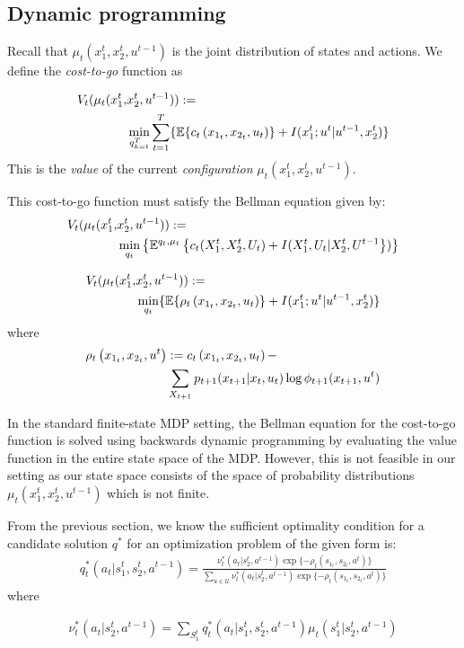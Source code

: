 \subsection{Dynamic programming}
Recall that $\mu_t(x_1^t, x_2^t,u^{t-1})$ is the joint distribution of states and actions. We define the \emph{cost-to-go} function as

\begin{align}
V_t(\mu_t(x_1^t,& x_2^t,u^{t-1}))  := \nonumber \\
& \min_{q_{k=t}^T} \sum_{t=1}^{T}\{ \mathbb{E}\{c_t\left(x_{1_t},x_{2_t},u_t \right)\} + I(x_1^t;u^t|u^{t-1},x_2^t) \}
\end{align}
This is the \textit{value} of the current \emph{configuration} $\mu_t(x_1^t, x_2^t,u^{t-1})$.

This cost-to-go function must satisfy the Bellman equation given by:
\begin{align}
V_t(\mu_t(x_1^t,& x_2^t,u^{t-1})) := \nonumber \\ 
& \min_{q_t} \left\lbrace \mathbb{E}^{q_t,\mu_t}\left\lbrace c_t(X_{1}^t,X_{2}^t,U_t) + I(X_1^t,U_t \vert X_{2}^t,U^{t-1} \right\rbrace) \right\rbrace
\end{align}

\begin{align}
V_t(\mu_t(x_1^t,& x_2^t,u^{t-1})) := \nonumber \\ 
& \min_{q_t} \{ \mathbb{E}\{\rho_t\left(x_{1_t},x_{2_t},u_t \right)\} + I(x_1^t;u^t|u^{t-1},x_2^t) \}
\end{align}
where 
\begin{align}
\rho_t\left(x_{1_t},x_{2_t},u^t\right) & :=  c_t\left(x_{1_t},x_{2_t},u_t\right) - \nonumber \\ & \sum_{X_{t+1}}p_{t+1}(x_{t+1}|x_t,u_t)\log \phi_{t+1}(x_{t+1},u^t)
\end{align}

In the standard finite-state MDP setting, the Bellman equation for the cost-to-go function is solved using backwards dynamic programming by evaluating the value function in the entire state space of the MDP. However, this is not feasible in our setting as our state space consists of the space of probability distributions $\mu_t(x_1^t, x_2^t,u^{t-1})$ which is not finite.  

From the previous section, we know the sufficient optimality condition for a candidate solution $q^{*}$ for an optimization problem of the given form is:
\begin{align}
q_t^{*}(a_t|s_1^t,s_2^t,a^{t-1}) = \frac{\nu_t^{*}(a_t|s_2^t,a^{t-1})\exp\{-\rho_t\left(s_{1_t},s_{2_t},a^t\right)  \}}{\sum_{u \in \mathcal{U}} \nu_t^{*}(a_t|s_2^t,a^{t-1})\exp\{-\rho_t\left(s_{1_t},s_{2_t},a^t\right)  \}}
\end{align}
where 


\begin{align}
\nu_t^{*}(a_t|s_2^t,a^{t-1}) = \sum_{S_1^t}q_t^{*}(a_t|s_1^t,s_2^t,a^{t-1})\mu_t(s_1^t|s_2^t,a^{t-1})
\end{align}
